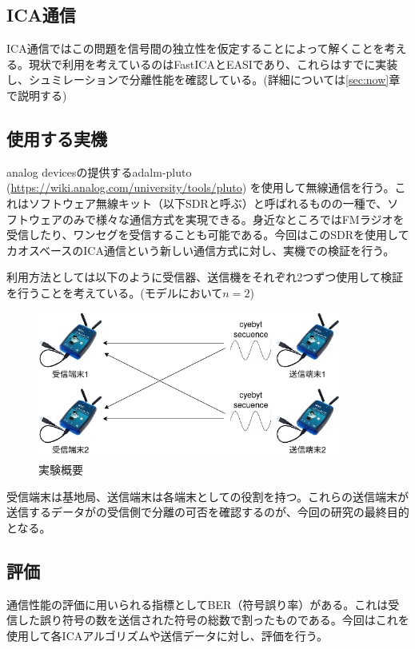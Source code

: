 \documentclass{jsarticle}
\begin{document}
\subsection{ICA通信}
ICA通信ではこの問題を信号間の独立性を仮定することによって解くことを考える。現状で利用を考えているのはFastICA\cite{fastica}とEASI\cite{easi}であり、これらはすでに実装し、シュミレーションで分離性能を確認している。(詳細については\ref{sec:now}章で説明する)

\subsection{使用する実機}
analog devicesの提供するadalm-pluto
(\url{https://wiki.analog.com/university/tools/pluto})
を使用して無線通信を行う。これはソフトウェア無線キット（以下SDRと呼ぶ）と呼ばれるものの一種で、ソフトウェアのみで様々な通信方式を実現できる。身近なところではFMラジオを受信したり、ワンセグを受信することも可能である。今回はこのSDRを使用してカオスベースのICA通信という新しい通信方式に対し、実機での検証を行う。

利用方法としては以下のように受信器、送信機をそれぞれ2つずつ使用して検証を行うことを考えている。(モデルにおいて$n=2$)

\begin{figure}[!htbp]
    \begin{center}
        \includegraphics[width=10cm]{img/3device.png}
        \caption{実験概要}
        \label{img:3device}
    \end{center}
\end{figure}

受信端末は基地局、送信端末は各端末としての役割を持つ。これらの送信端末が送信するデータがの受信側で分離の可否を確認するのが、今回の研究の最終目的となる。

\subsection{評価}
通信性能の評価に用いられる指標としてBER（符号誤り率）がある。これは受信した誤り符号の数を送信された符号の総数で割ったものである。今回はこれを使用して各ICAアルゴリズムや送信データに対し、評価を行う。
\end{document}
